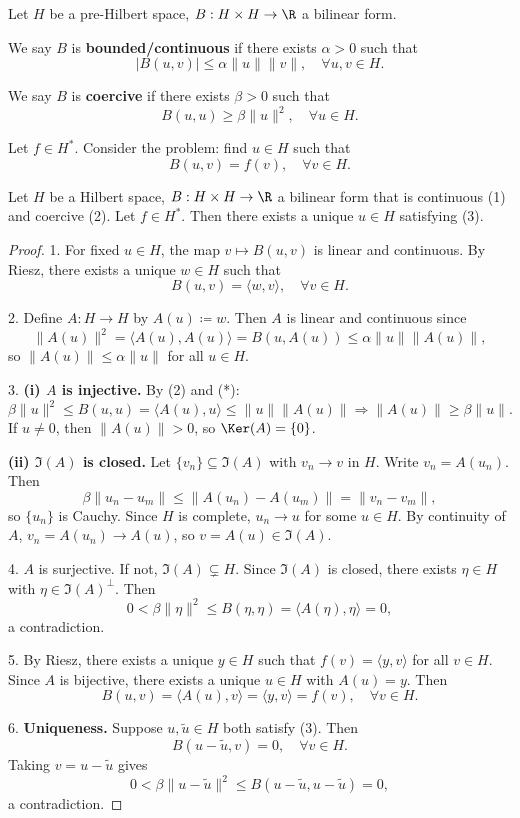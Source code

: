 Let $H$ be a pre-Hilbert space, $B: H \times H \to \R$ a bilinear form.

\begin{definition}
We say $B$ is \textbf{bounded/continuous} if there exists $\alpha > 0$ such that
\[
|B(u,v)| \leq \alpha \|u\| \|v\|, \quad \forall u,v \in H. \tag{1}
\]

We say $B$ is \textbf{coercive} if there exists $\beta > 0$ such that
\[
B(u,u) \geq \beta \|u\|^2, \quad \forall u \in H. \tag{2}
\]
\end{definition}

Let $f \in H^*$. Consider the problem: find $u \in H$ such that
\[
B(u,v) = f(v), \quad \forall v \in H. \tag{3}
\]

\begin{theorem}
Let $H$ be a Hilbert space, $B: H \times H \to \R$ a bilinear form that is continuous (1) and coercive (2). Let $f \in H^*$. Then there exists a unique $u \in H$ satisfying (3).
\end{theorem}

\begin{proof}
1. For fixed $u \in H$, the map $v \mapsto B(u,v)$ is linear and continuous. By Riesz, there exists a unique $w \in H$ such that
\[
B(u,v) = \langle w, v \rangle, \quad \forall v \in H. \tag{*}
\]

2. Define $A: H \to H$ by $A(u) \coloneqq w$. Then $A$ is linear and continuous since
\[
\|A(u)\|^2 = \langle A(u), A(u) \rangle = B(u, A(u)) \leq \alpha \|u\| \|A(u)\|,
\]
so $\|A(u)\| \leq \alpha \|u\|$ for all $u \in H$.

3. \textbf{(i) $A$ is injective.} By (2) and (*):
\[
\beta \|u\|^2 \leq B(u,u) = \langle A(u), u \rangle \leq \|u\| \|A(u)\| \Rightarrow \|A(u)\| \geq \beta \|u\|.
\]
If $u \neq 0$, then $\|A(u)\| > 0$, so $\Ker(A) = \{0\}$.

\textbf{(ii) $\Im(A)$ is closed.} Let $\{v_n\} \subseteq \Im(A)$ with $v_n \to v$ in $H$. Write $v_n = A(u_n)$. Then
\[
\beta \|u_n - u_m\| \leq \|A(u_n) - A(u_m)\| = \|v_n - v_m\|,
\]
so $\{u_n\}$ is Cauchy. Since $H$ is complete, $u_n \to u$ for some $u \in H$. By continuity of $A$, $v_n = A(u_n) \to A(u)$, so $v = A(u) \in \Im(A)$.

4. $A$ is surjective. If not, $\Im(A) \subsetneq H$. Since $\Im(A)$ is closed, there exists $\eta \in H$ with $\eta \in \Im(A)^\perp$. Then
\[
0 < \beta \|\eta\|^2 \leq B(\eta, \eta) = \langle A(\eta), \eta \rangle = 0,
\]
a contradiction.

5. By Riesz, there exists a unique $y \in H$ such that $f(v) = \langle y, v \rangle$ for all $v \in H$. Since $A$ is bijective, there exists a unique $u \in H$ with $A(u) = y$. Then
\[
B(u,v) = \langle A(u), v \rangle = \langle y, v \rangle = f(v), \quad \forall v \in H.
\]

6. \textbf{Uniqueness.} Suppose $u, \tilde{u} \in H$ both satisfy (3). Then
\[
B(u - \tilde{u}, v) = 0, \quad \forall v \in H.
\]
Taking $v = u - \tilde{u}$ gives
\[
0 < \beta \|u - \tilde{u}\|^2 \leq B(u - \tilde{u}, u - \tilde{u}) = 0,
\]
a contradiction.
\end{proof}

